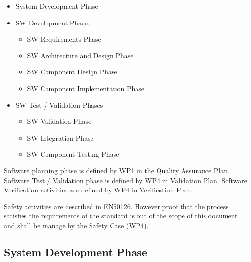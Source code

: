 \begin{itemize}
\item System Development Phase
\item SW Development Phases
  \begin{itemize}
  \item SW Requirements Phase
  \item SW Architecture and Design Phase
  \item SW Component Design Phase
  \item SW Component Implementation Phase
  \end{itemize}
\item SW Test / Validation Phases
  \begin{itemize}
  \item SW Validation Phase
  \item SW Integration Phase
  \item SW Component Testing Phase
  \end{itemize}
\end{itemize}

Software planning phase is defined by WP1 in the Quality Assurance Plan.
Software Test / Validation phase is defined by WP4 in Validation Plan.
Software Verification activities are defined by WP4 in Verification Plan.

Safety activities are described in EN50126.
However proof that the process satisfies the requirements of the standard is out of the scope of this document and shall be manage by the Safety Case (WP4).





\subsection{System Development Phase}
\label{sec:syst-devel-phase}

\begin{comment}This section shall define the activities links to  the system specification and model. 

This step is not explicitly defined in EN 50128 but is defined in EN 50129. However EN 50128  gives the expected output from this step  for the software activities :  System  Requirements Specification, System Safety Requirements Specification, System Architecture Description, External  Interface Specifications
\end{comment}

